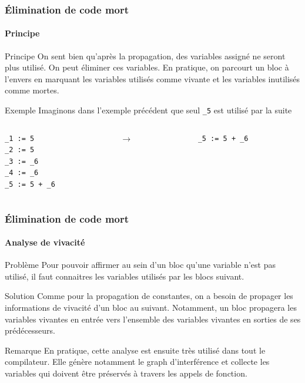 \documentclass{beamer}
\begin{document}
\begin{frame}[fragile]
    \frametitle{Élimination de code mort}
    \framesubtitle{Principe}
    
    \begin{block}{Principe}
        On sent bien qu'après la propagation, des variables assigné ne seront plus
        utilisé. On peut éliminer ces variables. En pratique, on parcourt un bloc
        à l'envers en marquant les variables utilisés comme vivante et les variables 
        inutilisés comme mortes.
    \end{block}
    \pause
    \begin{exampleblock}{Exemple}
        Imaginons dans l'exemple précédent que seul \lstinline{_5} est utilisé par la suite
         \begin{columns}
            \begin{column}{.40\textwidth}
                    \begin{lstlisting}
_1 := 5
_2 := 5
_3 := _6
_4 := _6
_5 := 5 + _6
                    \end{lstlisting}
            \end{column}
            \pause
            \begin{column}{.04\textwidth}
                $\rightarrow$
            \end{column}
            \begin{column}{.40\textwidth}
                    \begin{lstlisting}
_5 := 5 + _6

                    \end{lstlisting}
            \end{column}
        \end{columns}       
    \end{exampleblock}
\end{frame}

\begin{frame}
    \frametitle{Élimination de code mort}
    \framesubtitle{Analyse de vivacité}
    \begin{alertblock}{Problème}
        Pour pouvoir affirmer au sein d'un bloc qu'une variable n'est pas utilisé,
        il faut connaitres les variables utilisés par les blocs suivant. 
    \end{alertblock}
    \pause
    \begin{block}{Solution}
        Comme pour la propagation de constantes, on a besoin de propager les informations
        de vivacité d'un bloc au suivant. Notamment, un bloc propagera les variables
        vivantes en entrée vers l'ensemble des variables vivantes en sorties de ses
        prédécesseurs.
    \end{block}
    \pause
    \begin{block}{Remarque}
        En pratique, cette analyse est ensuite très utilisé dans tout le compilateur.
        Elle génère notamment  le graph d'interférence et collecte les variables qui doivent
        être préservés à travers les appels de fonction.
    \end{block}
\end{frame}
\end{document}
